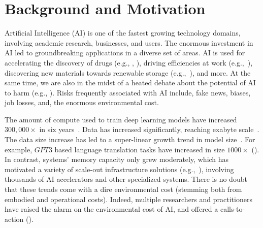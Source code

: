 \section{Background and Motivation}
\label{background}

Artificial Intelligence (AI) is one of the fastest growing technology domains, involving academic research, businesses, and users. The enormous investment in AI led to groundbreaking applications in a diverse set of areas.  AI is used for accelerating the discovery of
drugs (e.g., \cite{stark2022equibind}, \cite{ross2022large}), driving efficiencies at work (e.g.,~\cite{puri2021codenet}), discovering new materials towards renewable storage (e.g.,~\cite{zitnick2020}), and more. 
At the same time, we are also in the midst of a heated debate about the potential of AI to harm (e.g., 
\cite{aidanger}). Risks frequently associated with AI include, fake news, biases, job losses, and, the enormous environmental cost. 

The amount of compute used to train deep learning models have increased $300,000\times$ in six years~\cite{schwartz2019green}. 
Data has increased significantly, reaching exabyte scale~\cite{Wu2022}. The data size increase has led to a super-linear growth trend in model size~\cite{Wu2022}. For example, $GPT3$ based language translation tasks have increased in size $1000\times$ (\cite{brown2020language}). In contrast, systems' memory
capacity only grew moderately,
which has motivated a variety of scale-out infrastructure solutions (e.g.,~\cite{patterson2021carbon,Wu2022}), involving thousands of AI accelerators and other specialized systems. There is no doubt that these 
trends come with a dire environmental cost (stemming both from 
embodied and operational costs). Indeed, multiple researchers and practitioners have raised the alarm on the environmental cost of AI, and offered a calls-to-action (\cite{Strubell-policy-19,lacoste2019quantifying,Henderson2020Towards,schwartz2019green}). 

